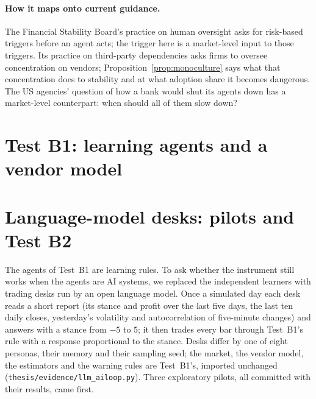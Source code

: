 \paragraph{How it maps onto current guidance.} The Financial Stability Board's practice on human oversight asks for risk-based triggers before an agent acts; the trigger here is a market-level input to those triggers. Its practice on third-party dependencies asks firms to oversee concentration on vendors; Proposition~\ref{prop:monoculture} says what that concentration does to stability and at what adoption share it becomes dangerous. The US agencies' question of how a bank would shut its agents down has a market-level counterpart: when should all of them slow down?

\section{Test B1: learning agents and a vendor model}\label{sec:ai_b1}



\section{Language-model desks: pilots and Test B2}\label{sec:ai_b2}


The agents of Test~B1 are learning rules. To ask whether the instrument still works when the agents are AI systems, we replaced the independent learners with trading desks run by an open language model. Once a simulated day each desk reads a short report (its stance and profit over the last five days, the last ten daily closes, yesterday's volatility and autocorrelation of five-minute changes) and answers with a stance from $-5$ to $5$; it then trades every bar through Test~B1's rule with a response proportional to the stance. Desks differ by one of eight personas, their memory and their sampling seed; the market, the vendor model, the estimators and the warning rules are Test~B1's, imported unchanged (\nolinkurl{thesis/evidence/llm_ailoop.py}). Three exploratory pilots, all committed with their results, came first.

